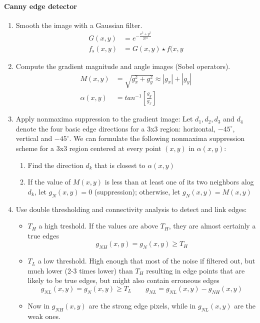 \paragraph{Canny edge detector}
\begin{enumerate}
	\item Smooth the image with a Gaussian filter.
		\begin{align*}
			G(x,y)	&= e^{-\frac{x^2+y^2}{2\sigma^2}} \\
			f_s(x,y)&=G(x,y)\star f(x,y
		\end{align*}
	\item Compute the gradient magnitude and angle images (Sobel operators).
		\begin{align*}
			M(x,y) 		&= \sqrt{g_x^2+g_y^2} \approx |g_x| + |g_y| \\
			\alpha(x,y)	&= tan^{-1}\left[\frac{g_y}{g_x}\right]
		\end{align*}
	\item Apply nonmaxima suppression to the gradient image:
		Let $d_1, d_2, d_3$ and $d_4$ denote the four basic edge directions for a 3x3 region: horizontal, $-45^\circ$, vertical and $-45^\circ$. 
		We can formulate the following nonmaxima suppression scheme for a 3x3 region centered at every point $(x,y)$ in $\alpha(x,y)$:
		\begin{enumerate}
			\item Find the direction $d_k$ that is closest to $\alpha(x,y)$
			\item If the value of $M(x,y)$ is less than at least one of its two neighbors alog $d_k$, let $g_N(x,y) = 0$ (suppression); otherwise, let $g_N(x,y) = M(x,y)$
		\end{enumerate}
	\item Use double thresholding and connectivity analysis to detect and link edges:
		\begin{itemize}
			\item $T_H$ a high treshold. If the values are above $T_H$, they are almost certainly a true edges
				\[
					g_{NH}(x,y) = g_N(x,y) \geq T_H
				\]
			\item $T_L$ a low threshold. High enough that most of the noise if filtered out, but much lower (2-3 times lower) than $T_H$ resulting in edge points that are likely to be true edges, but might also contain erroneous edges
				\[
					g_{NL}(x,y) = g_N(x,y) \geq T_L \qquad g_{NL} = g_{NL}(x,y) - g_{NH}(x,y)
				\]
			\item Now in $g_{NH}(x,y)$ are the strong edge pixels, while in $g_{NL}(x,y)$ are the weak ones.

\end{itemize}
\end{enumerate}
